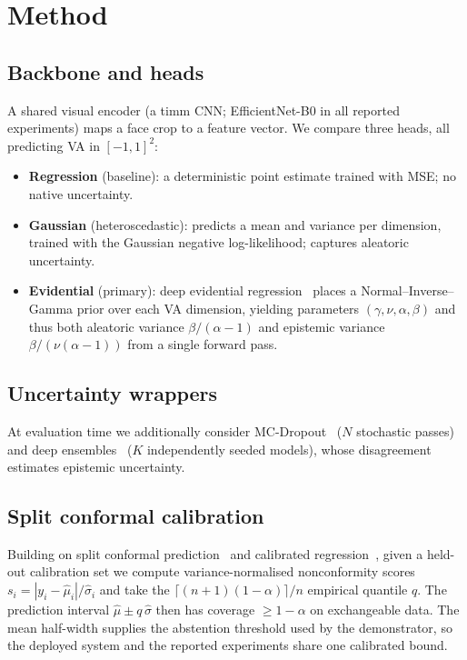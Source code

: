 \section{Method}

\subsection{Backbone and heads}
A shared visual encoder (a timm CNN; EfficientNet-B0 in all reported
experiments) maps a face crop to a feature vector. We compare three heads, all predicting VA in
$[-1,1]^2$:
\begin{itemize}
  \item \textbf{Regression} (baseline): a deterministic point estimate trained
        with MSE; no native uncertainty.
  \item \textbf{Gaussian} (heteroscedastic): predicts a mean and variance per
        dimension, trained with the Gaussian negative log-likelihood; captures
        aleatoric uncertainty.
  \item \textbf{Evidential} (primary): deep evidential
        regression~\cite{amini2020evidential} places a
        Normal--Inverse--Gamma prior over each VA dimension, yielding parameters
        $(\gamma,\nu,\alpha,\beta)$ and thus both aleatoric variance
        $\beta/(\alpha-1)$ and epistemic variance $\beta/(\nu(\alpha-1))$ from a
        single forward pass.
\end{itemize}

\subsection{Uncertainty wrappers}
At evaluation time we additionally consider MC-Dropout~\cite{gal2016dropout}
($N$ stochastic passes) and deep ensembles~\cite{lakshminarayanan2017simple}
($K$ independently seeded models), whose disagreement estimates epistemic
uncertainty.

\subsection{Split conformal calibration}
Building on split conformal prediction~\cite{vovk2005algorithmic} and calibrated
regression~\cite{kuleshov2018calibrated}, given a held-out calibration set we
compute variance-normalised nonconformity
scores $s_i = |y_i - \hat\mu_i| / \hat\sigma_i$ and take the
$\lceil (n{+}1)(1-\alpha)\rceil/n$ empirical quantile $q$. The prediction
interval $\hat\mu \pm q\,\hat\sigma$ then has coverage $\ge 1-\alpha$ on
exchangeable data. The mean half-width supplies the abstention threshold used by
the demonstrator, so the deployed system and the reported experiments share one
calibrated bound.

